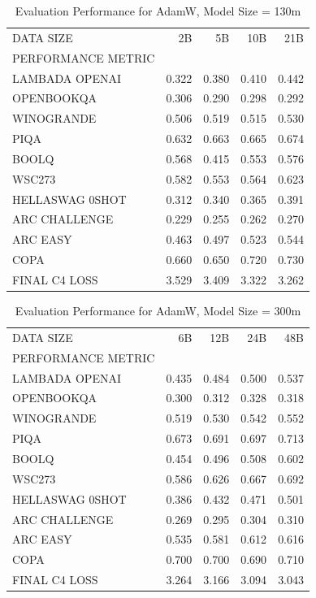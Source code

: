 \begin{table}
[H] \centering \caption{Evaluation Performance for AdamW, Model Size = 130m}
\label{tab:eval-performance-adamw-130M}
\begin{tabular}{lrrrr}
\toprule
DATA SIZE & 2B & 5B & 10B & 21B \\
PERFORMANCE METRIC &  &  &  &  \\
\midrule
LAMBADA OPENAI & 0.322 & 0.380 & 0.410 & 0.442 \\
OPENBOOKQA & 0.306 & 0.290 & 0.298 & 0.292 \\
WINOGRANDE & 0.506 & 0.519 & 0.515 & 0.530 \\
PIQA & 0.632 & 0.663 & 0.665 & 0.674 \\
BOOLQ & 0.568 & 0.415 & 0.553 & 0.576 \\
WSC273 & 0.582 & 0.553 & 0.564 & 0.623 \\
HELLASWAG 0SHOT & 0.312 & 0.340 & 0.365 & 0.391 \\
ARC CHALLENGE & 0.229 & 0.255 & 0.262 & 0.270 \\
ARC EASY & 0.463 & 0.497 & 0.523 & 0.544 \\
COPA & 0.660 & 0.650 & 0.720 & 0.730 \\
FINAL C4 LOSS & 3.529 & 3.409 & 3.322 & 3.262 \\
\bottomrule
\end{tabular}
\end{table}


\begin{table}
[H] \centering \caption{Evaluation Performance for AdamW, Model Size = 300m}
\label{tab:eval-performance-adamw-300M}
\begin{tabular}{lrrrr}
\toprule
DATA SIZE & 6B & 12B & 24B & 48B \\
PERFORMANCE METRIC &  &  &  &  \\
\midrule
LAMBADA OPENAI & 0.435 & 0.484 & 0.500 & 0.537 \\
OPENBOOKQA & 0.300 & 0.312 & 0.328 & 0.318 \\
WINOGRANDE & 0.519 & 0.530 & 0.542 & 0.552 \\
PIQA & 0.673 & 0.691 & 0.697 & 0.713 \\
BOOLQ & 0.454 & 0.496 & 0.508 & 0.602 \\
WSC273 & 0.586 & 0.626 & 0.667 & 0.692 \\
HELLASWAG 0SHOT & 0.386 & 0.432 & 0.471 & 0.501 \\
ARC CHALLENGE & 0.269 & 0.295 & 0.304 & 0.310 \\
ARC EASY & 0.535 & 0.581 & 0.612 & 0.616 \\
COPA & 0.700 & 0.700 & 0.690 & 0.710 \\
FINAL C4 LOSS & 3.264 & 3.166 & 3.094 & 3.043 \\
\bottomrule
\end{tabular}
\end{table}


